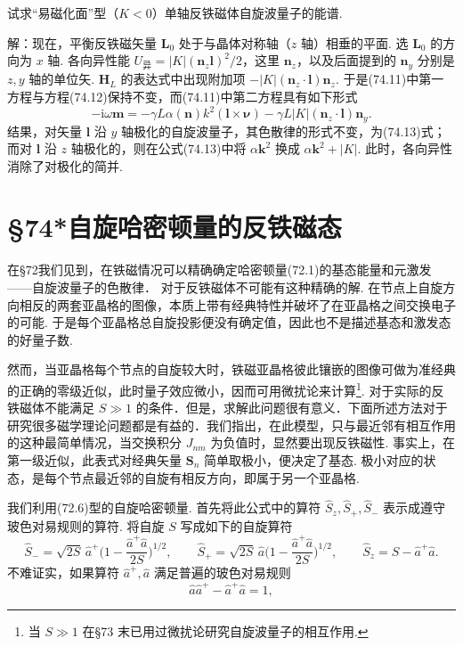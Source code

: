 \begin{xiti}

试求“易磁化面”型（$K<0$）单轴反铁磁体自旋波量子的能谱.

{\heiti 解：}现在，平衡反铁磁矢量 $\bm{L}_0$ 处于与晶体对称轴（$z$ 轴）相垂的平面. 选 $\bm{L}_0$ 的方向为 $x$ 轴. 各向异性能 $U_{\text{异}}=|K|(\bm{n}_z\bm{l})^2/2$，这里 $\bm{n}_z$，以及后面提到的 $\bm{n}_y$ 分别是 $z,y$ 轴的单位矢. $\bm{H}_L$ 的表达式中出现附加项 $-|K|(\bm{n}_z\cdot\bm{l})\bm{n}_z$. 于是(74.11)中第一方程与方程(74.12)保持不变，而(74.11)中第二方程具有如下形式
\begin{equation*}
-\mathrm{i}\omega\bm{m}=-\gamma L\alpha(\bm{n})k^2(\bm{l}\times\bm{\nu})
-\gamma L|K|(\bm{n}_z\cdot\bm{l})\bm{n}_y.
\end{equation*}
结果，对矢量 $\bm{l}$ 沿 $y$ 轴极化的自旋波量子，其色散律的形式不变，为(74.13)式；而对 $\bm{l}$ 沿 $z$ 轴极化的，则在公式(74.13)中将 $\alpha\bm{k}^2$ 换成 $\alpha\bm{k}^2+|K|$. 此时，各向异性消除了对极化的简并.

\end{xiti}

\section*{§74*\quad 自旋哈密顿量的反铁磁态}
{}

在§72我们见到，在铁磁情况可以精确确定哈密顿量(72.1)的基态能量和元激发——自旋波量子的色散律． 对于反铁磁体不可能有这种精确的解. 在节点上自旋方向相反的两套亚晶格的图像，本质上带有经典特性并破坏了在亚晶格之间交换电子的可能. 于是每个亚晶格总自旋投影便没有确定值，因此也不是描述基态和激发态的好量子数.

然而，当亚晶格每个节点的自旋较大时，铁磁亚晶格彼此镶嵌的图像可做为准经典的正确的零级近似，此时量子效应微小，因而可用微扰论来计算\footnote{当 $S\gg1$ 在§73 末已用过微扰论研究自旋波量子的相互作用.}. 对于实际的反铁磁体不能满足 $S\gg1$ 的条件．但是，求解此问题很有意义．下面所述方法对于研究很多磁学理论问题都是有益的．我们指出，在此模型，只与最近邻有相互作用的这种最简单情况，当交换积分 $J_{nm}$ 为负值时，显然要出现反铁磁性. 事实上，在第一级近似，此表式对经典矢量 $\bm{S}_n$ 简单取极小，便决定了基态. 极小对应的状态，是每个节点最近邻的自旋有相反方向，即属于另一个亚晶格.

我们利用(72.6)型的自旋哈密顿量. 首先将此公式中的算符 $\hat{S}_z,\hat{S}_{+},\hat{S}_{-}$ 表示成遵守玻色对易规则的算符. 将自旋 $S$ 写成如下的自旋算符
\begin{equation*}
\hat{S}_{-}=\sqrt{2S}\,\hat{a}^{+}\biggl(1-\frac{\hat{a}^{+}\hat{a}}{2S}\biggr)^{\!1/2},
\qquad
\hat{S}_{+}=\sqrt{2S}\,\hat{a}\biggl(1-\frac{\hat{a}^{+}\hat{a}}{2S}\biggr)^{\!1/2},
\qquad
\hat{S}_z=S-\hat{a}^{+}\hat{a}.
\tag{74*.1}
\end{equation*}
不难证实，如果算符 $\hat{a}^{+},\hat{a}$ 满足普遍的玻色对易规则
\begin{equation*}
\hat{a}\hat{a}^{+}-\hat{a}^{+}\hat{a}=1,
\end{equation*}


